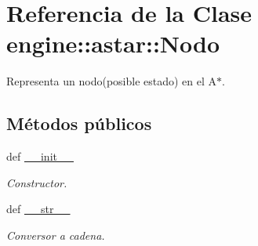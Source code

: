 \hypertarget{classengine_1_1astar_1_1Nodo}{
\section{\-Referencia de la \-Clase engine\-:\-:astar\-:\-:\-Nodo}
\label{classengine_1_1astar_1_1Nodo}
}


\-Representa un nodo(posible estado) en el \-A$\ast$.  


\subsection*{\-Métodos públicos}
\begin{DoxyCompactItemize}
\item 
def \hyperlink{classengine_1_1astar_1_1Nodo_ac5ffb66418a04811e0dfe2ba4d7118a6}{\-\_\-\-\_\-init\-\_\-\-\_\-}
\begin{DoxyCompactList}\small\item\em \-Constructor. \end{DoxyCompactList}\item 
\hypertarget{classengine_1_1astar_1_1Nodo_aa362f07cfc6708c4610d9f4140c77756}{
def \hyperlink{classengine_1_1astar_1_1Nodo_aa362f07cfc6708c4610d9f4140c77756}{\-\_\-\-\_\-str\-\_\-\-\_\-}}
\label{classengine_1_1astar_1_1Nodo_aa362f07cfc6708c4610d9f4140c77756}

\begin{DoxyCompactList}\small\item\em \-Conversor a cadena. \end{DoxyCompactList}\end{DoxyCompactItemize}
